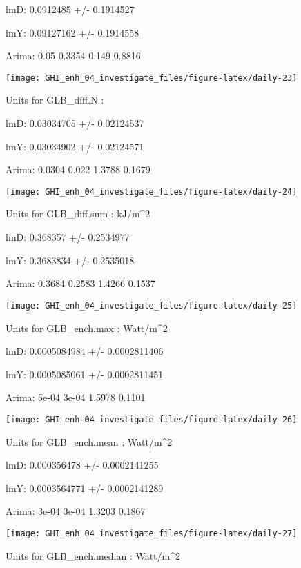 \documentclass[
  10pt,
  a4paper,oneside]{article}
\begin{document}
lmD: 0.0912485 +/- 0.1914527

lmY: 0.09127162 +/- 0.1914558

Arima: 0.05 0.3354 0.149 0.8816

\begin{center}\texttt{[image: GHI\_enh\_04\_investigate\_files/figure-latex/daily-23]} \end{center}

Units for GLB\_diff.N :

lmD: 0.03034705 +/- 0.02124537

lmY: 0.03034902 +/- 0.02124571

Arima: 0.0304 0.022 1.3788 0.1679

\begin{center}\texttt{[image: GHI\_enh\_04\_investigate\_files/figure-latex/daily-24]} \end{center}

Units for GLB\_diff.sum : kJ/m\^{}2

lmD: 0.368357 +/- 0.2534977

lmY: 0.3683834 +/- 0.2535018

Arima: 0.3684 0.2583 1.4266 0.1537

\begin{center}\texttt{[image: GHI\_enh\_04\_investigate\_files/figure-latex/daily-25]} \end{center}

Units for GLB\_ench.max : Watt/m\^{}2

lmD: 0.0005084984 +/- 0.0002811406

lmY: 0.0005085061 +/- 0.0002811451

Arima: 5e-04 3e-04 1.5978 0.1101

\begin{center}\texttt{[image: GHI\_enh\_04\_investigate\_files/figure-latex/daily-26]} \end{center}

Units for GLB\_ench.mean : Watt/m\^{}2

lmD: 0.000356478 +/- 0.0002141255

lmY: 0.0003564771 +/- 0.0002141289

Arima: 3e-04 3e-04 1.3203 0.1867

\begin{center}\texttt{[image: GHI\_enh\_04\_investigate\_files/figure-latex/daily-27]} \end{center}

Units for GLB\_ench.median : Watt/m\^{}2
\end{document}
